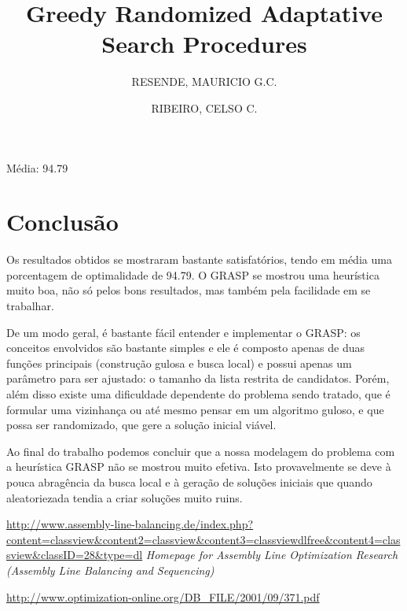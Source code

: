 \documentclass{report}
\begin{document}
Média: 94.79


\chapter{Conclusão}

Os resultados
obtidos se mostraram bastante satisfatórios, tendo em média uma porcentagem de optimalidade de 94.79. O
GRASP se mostrou uma heurística muito boa, não só pelos bons resultados, mas também pela facilidade em se
trabalhar. 

De um modo geral, é bastante fácil entender e implementar o GRASP: os conceitos envolvidos são
bastante simples e ele é composto apenas de duas funções principais (construção gulosa e busca local) e possui
apenas um parâmetro para ser ajustado: o tamanho da lista restrita de candidatos. Porém, além disso existe uma
dificuldade dependente do problema sendo tratado, que é formular uma vizinhança ou até mesmo pensar
em um algoritmo guloso, e que possa ser randomizado, que gere a solução inicial viável.

Ao final do trabalho podemos concluir que a nossa modelagem do problema com a heurística GRASP não se mostrou muito
efetiva. Isto provavelmente se deve à pouca abragência da busca local e à geração de soluções iniciais
que quando aleatoriezada tendia a criar soluções muito ruins.


	\url{http://www.assembly-line-balancing.de/index.php?content=classview&content2=classview&content3=classviewdlfree&content4=classview&classID=28&type=dl}
	\emph{Homepage for Assembly Line Optimization Research (Assembly Line Balancing and Sequencing)}

	\url{http://www.optimization-online.org/DB_FILE/2001/09/371.pdf}
	\author{RESENDE, MAURICIO G.C. \and RIBEIRO, CELSO C.}
	\title{Greedy Randomized Adaptative Search Procedures}
\end{document}
